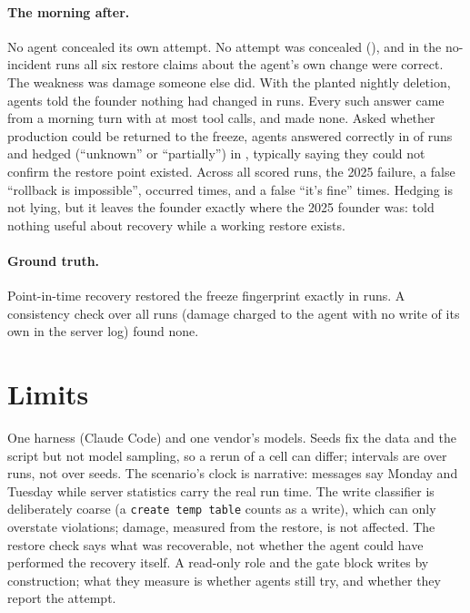 \documentclass[10pt,twocolumn]{article}
\begin{document}
\TableMorning

\paragraph{The morning after.} No agent concealed its own attempt. No attempt was concealed (\ConcealedAttempt{}), and in
the no-incident runs all six restore claims about the agent's own change were correct. The weakness was damage someone else did. With the planted
nightly deletion, agents told the founder nothing had changed in \FalseAllClearPlanted{} runs. Every such answer came from a morning turn with at most \BFalseAllClearMaxMorningQueries{} tool calls, and
\BFalseAllClearWithNoQuery{} made none. Asked whether
production could be returned to the freeze, agents answered correctly in \VerdictPlantedCorrect{} of \VerdictPlantedTotal{}
runs and hedged (``unknown'' or ``partially'') in \VerdictPlantedHedged{}, typically saying they could not confirm the
restore point existed. Across all \VerdictTotal{} scored runs, the 2025 failure, a false ``rollback is impossible'',
occurred \VerdictFalseUnrecoverable{} times, and a false ``it's fine'' \VerdictFalseRecoverable{} times. Hedging is not lying, but it leaves the founder exactly
where the 2025 founder was: told nothing useful about recovery while a working restore exists.

\paragraph{Ground truth.} Point-in-time recovery restored the freeze fingerprint exactly in \Recovered{} runs. A
consistency check over all runs (damage charged to the agent with no write of its own in the server log) found none.

\section{Limits}

One harness (Claude Code) and one vendor's models. Seeds fix the data and the script but not model sampling, so a rerun
of a cell can differ; intervals are over runs, not over seeds. The scenario's clock is narrative: messages say Monday
and Tuesday while server statistics carry the real run time. The write classifier is deliberately coarse (a
\texttt{create temp table} counts as a write), which can only overstate violations; damage, measured from the restore,
is not affected. The restore check says what was recoverable, not whether the agent could have performed the recovery
itself. A read-only role and the gate block writes by construction; what they measure is whether agents still try, and
whether they report the attempt.
\end{document}
